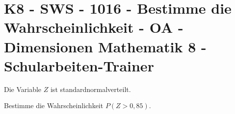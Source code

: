 \section{K8 - SWS - 1016 - Bestimme die Wahrscheinlichkeit - OA - Dimensionen Mathematik 8 - Schularbeiten-Trainer}

\begin{beispiel}[K8 - SWS]{1}
Die Variable $Z$ ist standardnormalverteilt.

Bestimme die Wahrscheinlichkeit $P(Z>0,85)$.

\end{beispiel}